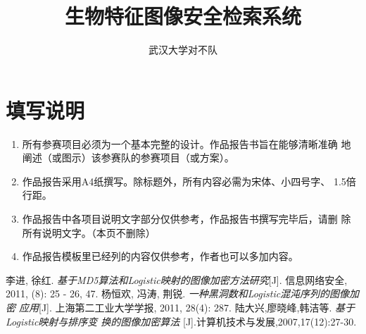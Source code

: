 \documentclass[utf8, 12pt, titlepage, a4paper]{ctexrep}
\author{武汉大学对不队}
\title{生物特征图像安全检索系统}
\begin{document}


\section*{填写说明}
\begin{enumerate}
\item 所有参赛项目必须为一个基本完整的设计。作品报告书旨在能够清晰准确
  地阐述（或图示）该参赛队的参赛项目（或方案）。
\item 作品报告采用A4纸撰写。除标题外，所有内容必需为宋体、小四号字、
  1.5倍行距。
\item 作品报告中各项目说明文字部分仅供参考，作品报告书撰写完毕后，请删
  除所有说明文字。（本页不删除）
\item 作品报告模板里已经列的内容仅供参考，作者也可以多加内容。
\end{enumerate}

\tableofcontents







\begin{thebibliography}{9}
 李进, 徐红.
 \emph{基于MD5算法和Logistic映射的图像加密方法研究}[J]. 信息网络安全,
 2011, (8): 25 - 26, 47.
 杨恒欢, 冯涛, 荆锐. \emph{一种黑洞数和Logistic混沌序列的图像加密
  应用}[J]. 上海第二工业大学学报, 2011, 28(4): 287.
 陆大兴,廖晓峰,韩洁等. \emph{基于Logistic映射与排序变
    换的图像加密算法}
[J].计算机技术与发展,2007,17(12):27-30.
\end{thebibliography}
\end{document}
